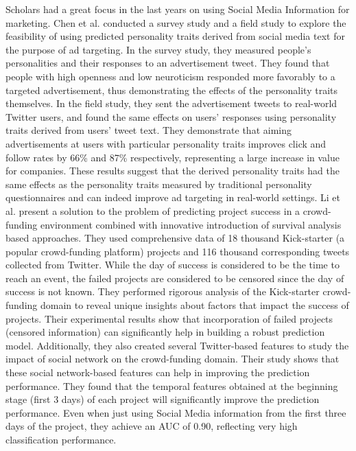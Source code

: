\documentclass[]{book}
\begin{document}
Scholars had a great focus in the last years on using Social Media
Information for marketing. Chen et al. \citep{chen2015making} conducted
a survey study and a field study to explore the feasibility of using
predicted personality traits derived from social media text for the
purpose of ad targeting. In the survey study, they measured people's
personalities and their responses to an advertisement tweet. They found
that people with high openness and low neuroticism responded more
favorably to a targeted advertisement, thus demonstrating the effects of
the personality traits themselves. In the field study, they sent the
advertisement tweets to real-world Twitter users, and found the same
effects on users' responses using personality traits derived from users'
tweet text. They demonstrate that aiming advertisements at users with
particular personality traits improves click and follow rates by 66\%
and 87\% respectively, representing a large increase in value for
companies. These results suggest that the derived personality traits had
the same effects as the personality traits measured by traditional
personality questionnaires and can indeed improve ad targeting in
real-world settings. Li et al. \citep{li2016project} present a solution
to the problem of predicting project success in a crowd-funding
environment combined with innovative introduction of survival analysis
based approaches. They used comprehensive data of 18 thousand
Kick-starter (a popular crowd-funding platform) projects and 116
thousand corresponding tweets collected from Twitter. While the day of
success is considered to be the time to reach an event, the failed
projects are considered to be censored since the day of success is not
known. They performed rigorous analysis of the Kick-starter
crowd-funding domain to reveal unique insights about factors that impact
the success of projects. Their experimental results show that
incorporation of failed projects (censored information) can
significantly help in building a robust prediction model. Additionally,
they also created several Twitter-based features to study the impact of
social network on the crowd-funding domain. Their study shows that these
social network-based features can help in improving the prediction
performance. They found that the temporal features obtained at the
beginning stage (first 3 days) of each project will significantly
improve the prediction performance. Even when just using Social Media
information from the first three days of the project, they achieve an
AUC of 0.90, reflecting very high classification performance.
\end{document}
